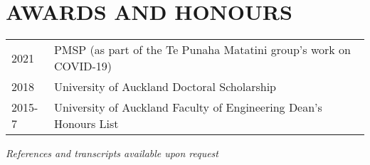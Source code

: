 \documentclass[paper=a4paper,fontsize=11pt]{scrartcl} %
\newlength{\spacebox}
\newcommand{\NewPart}[1]{\section*{\uppercase{#1}}}
\begin{document}
\NewPart{Awards and Honours}
\begin{tabular}{p{1.0\spacebox} p{6.7\spacebox}}
    2021 & PMSP (as part of the Te Punaha Matatini group's work on COVID-19)\\
    2018 & University of Auckland Doctoral Scholarship\\
    2015-7 & University of Auckland Faculty of Engineering Dean's Honours List\\
\end{tabular}


\vspace{1ex} \titlerule[2pt] \vspace{1ex}
\textit{References and transcripts available upon request}
\end{document}

